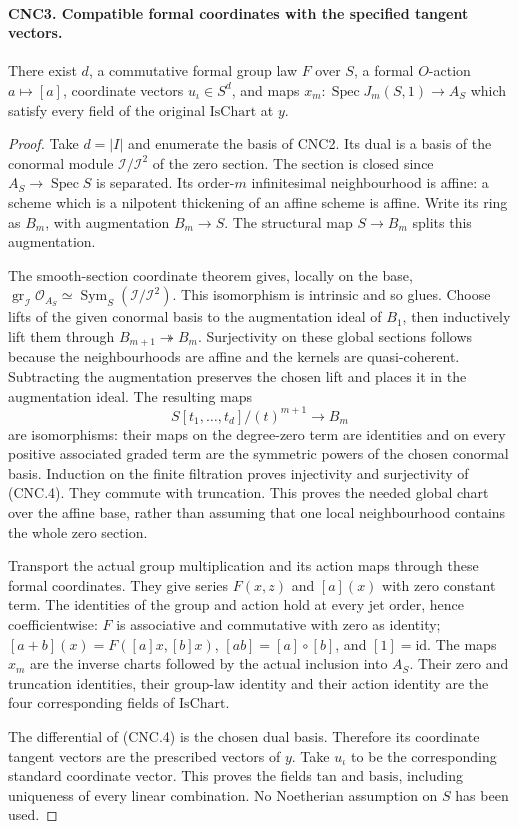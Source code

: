 \paragraph{CNC3. Compatible formal coordinates with the specified tangent vectors.}
\label{claim:CNC3}
There exist \(d\), a commutative formal group law \(F\) over \(S\),
a formal \(O\)-action \(a\mapsto[a]\), coordinate vectors
\(u_\iota\in S^d\), and maps
\(x_m:\operatorname{Spec}J_m(S,1)\to A_S\) which satisfy every
field of the original \(\mathrm{IsChart}\) at \(y\).
\begin{proof}
Take \(d=|I|\) and enumerate the basis of CNC2.  Its dual is a basis
of the conormal module \(\mathcal I/\mathcal I^2\) of the zero
section.  The section is closed since \(A_S\to\operatorname{Spec}S\)
is separated.  Its order-\(m\) infinitesimal neighbourhood is affine:
a scheme which is a nilpotent thickening of an affine scheme is affine.
Write its ring as \(B_m\), with augmentation \(B_m\to S\).
The structural map \(S\to B_m\) splits this augmentation.

The smooth-section coordinate theorem gives, locally on the base,
\(\operatorname{gr}_{\mathcal I}\mathcal O_{A_S}
 \simeq\operatorname{Sym}_S(\mathcal I/\mathcal I^2)\).
This isomorphism is intrinsic and so glues.  Choose lifts of the given
conormal basis to the augmentation ideal of \(B_1\), then inductively
lift them through \(B_{m+1}\twoheadrightarrow B_m\).
Surjectivity on these global sections follows because the neighbourhoods
are affine and the kernels are quasi-coherent.  Subtracting the
augmentation preserves the chosen lift and places it in the augmentation
ideal.  The resulting maps
\[
 S[t_1,\ldots,t_d]/(t)^{m+1}\longrightarrow B_m              \tag{CNC.4}
\]
are isomorphisms: their maps on the degree-zero term are identities and
on every positive associated graded term are the symmetric powers of
the chosen conormal basis.  Induction on the finite filtration proves
injectivity and surjectivity of (CNC.4).  They commute with truncation.
This proves the needed global chart over the affine base, rather than
assuming that one local neighbourhood contains the whole zero section.

Transport the actual group multiplication and its action maps through
these formal coordinates.  They give series \(F(x,z)\) and \([a](x)\)
with zero constant term.  The identities of the group and action hold
at every jet order, hence coefficientwise: \(F\) is associative and
commutative with zero as identity; \([a+b](x)=F([a]x,[b]x)\),
\([ab]=[a]\circ[b]\), and \([1]=\mathrm{id}\).
The maps \(x_m\) are the inverse charts followed by the actual
inclusion into \(A_S\).  Their zero and truncation identities, their
group-law identity and their action identity are the four corresponding
fields of \(\mathrm{IsChart}\).

The differential of (CNC.4) is the chosen dual basis.  Therefore its
coordinate tangent vectors are the prescribed vectors of \(y\).
Take \(u_\iota\) to be the corresponding standard coordinate vector.
This proves the fields \(\mathrm{tan}\) and \(\mathrm{basis}\),
including uniqueness of every linear combination.  No Noetherian
assumption on \(S\) has been used.
\end{proof}


